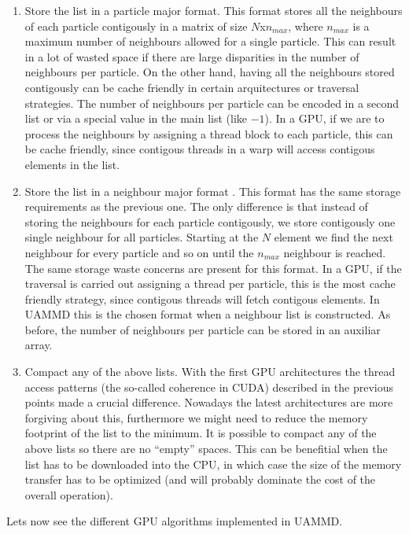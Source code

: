 \documentclass[ twoside,openright,titlepage,numbers=noenddot,%
headinclude,footinclude,cleardoublepage=empty,abstract=on,
BCOR=5mm,paper=a4,fontsize=11pt, dvipsnames
]{scrreprt}
\newcommand{\uammd}{\gls{UAMMD}\xspace}
\newcommand{\gpu}{\gls{GPU}\xspace}
\begin{document}
\begin{enumerate}
\item Store the list in a particle major format\cite{Anderson2008}\cite{Plimpton1995}.
  This format stores all the neighbours of each particle contigously in a matrix of size $N$x$n_{max}$, where $n_{max}$ is a maximum number of neighbours allowed for a single particle. This can result in a lot of wasted space if there are large disparities in the number of neighbours per particle. On the other hand, having all the neighbours stored contigously can be cache friendly in certain arquitectures or traversal strategies. The number of neighbours per particle can be encoded in a second list or via a special value in the main list (like $-1$). In a \gpu, if we are to process the neighbours by assigning a thread block to each particle, this can be cache friendly, since contigous threads in a warp will access contigous elements in the list.
\item Store the list in a neighbour major format \cite{Berendsen1995}.
  This format has the same storage requirements as the previous one. The only difference is that instead of storing the neighbours for each particle contigously, we store contigously one single neighbour for all particles. Starting at the $N$ element we find the next neighbour for every particle and so on until the $n_{max}$ neighbour is reached. The same storage waste concerns are present for this format. In a \gpu, if the traversal is carried out assigning a thread per particle, this is the most cache friendly strategy, since contigous threads will fetch contigous elements. In \uammd this is the chosen format when a neighbour list is constructed. 
  As before, the number of neighbours per particle can be stored in an auxiliar array.
\item Compact any of the above lists.
  With the first \gpu architectures the thread access patterns (the so-called coherence in CUDA) described in the previous points made a crucial difference. Nowadays the latest architectures are more forgiving about this, furthermore we might need to reduce the memory footprint of the list to the minimum. It is possible to compact any of the above lists so there are no ``empty'' spaces. This can be benefitial when the list has to be downloaded into the CPU, in which case the size of the memory transfer has to be optimized (and will probably dominate the cost of the overall operation).
\end{enumerate}

Lets now see the different \gpu algorithms implemented in \uammd.
\end{document}
